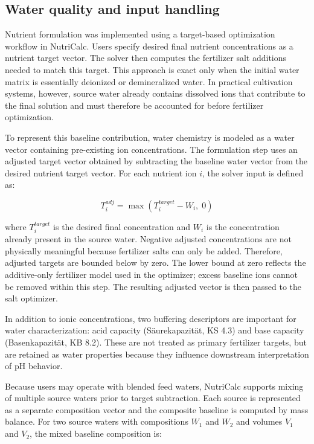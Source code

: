 \documentclass[
  letterpaper,
  DIV=11,
  numbers=noendperiod]{scrreprt}
\begin{document}
\subsection{Water quality and input
handling}\label{water-quality-and-input-handling}

Nutrient formulation was implemented using a target-based optimization
workflow in NutriCalc. Users specify desired final nutrient
concentrations as a nutrient target vector. The solver then computes the
fertilizer salt additions needed to match this target. This approach is
exact only when the initial water matrix is essentially deionized or
demineralized water. In practical cultivation systems, however, source
water already contains dissolved ions that contribute to the final
solution and must therefore be accounted for before fertilizer
optimization.

To represent this baseline contribution, water chemistry is modeled as a
water vector containing pre-existing ion concentrations. The formulation
step uses an adjusted target vector obtained by subtracting the baseline
water vector from the desired nutrient target vector. For each nutrient
ion \(i\), the solver input is defined as:

\[
T_i^{adj} = \max\!\left(T_i^{target} - W_i,\; 0\right)
\]

where \(T_i^{target}\) is the desired final concentration and \(W_i\) is
the concentration already present in the source water. Negative adjusted
concentrations are not physically meaningful because fertilizer salts
can only be added. Therefore, adjusted targets are bounded below by
zero. The lower bound at zero reflects the additive-only fertilizer
model used in the optimizer; excess baseline ions cannot be removed
within this step. The resulting adjusted vector is then passed to the
salt optimizer.

In addition to ionic concentrations, two buffering descriptors are
important for water characterization: acid capacity (Säurekapazität, KS
4.3) and base capacity (Basenkapazität, KB 8.2). These are not treated
as primary fertilizer targets, but are retained as water properties
because they influence downstream interpretation of pH behavior.

Because users may operate with blended feed waters, NutriCalc supports
mixing of multiple source waters prior to target subtraction. Each
source is represented as a separate composition vector and the composite
baseline is computed by mass balance. For two source waters with
compositions \(W_1\) and \(W_2\) and volumes \(V_1\) and \(V_2\), the
mixed baseline composition is:
\end{document}
